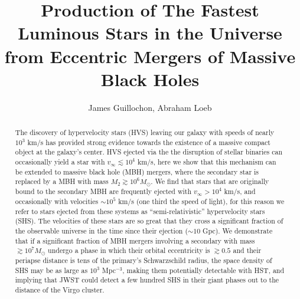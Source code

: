 \documentclass[a4paper,twocolumn]{emulateapj}
\begin{document}


\title{Production of The Fastest Luminous Stars in the Universe from Eccentric Mergers of Massive Black Holes}

\author{James Guillochon, Abraham Loeb}


\begin{abstract} 
The discovery of hypervelocity stars (HVS) leaving our galaxy with speeds of nearly $10^{3}$ km/s has provided strong evidence towards the existence of a massive compact object at the galaxy's center. HVS ejected via the the disruption of stellar binaries can occasionally yield a star with $v_{\infty} \lesssim 10^4$ km/s, here we show that this mechanism can be extended to massive black hole (MBH) mergers, where the secondary star is replaced by a MBH with mass $M_2 \gtrsim 10^6 M_{\odot}$. We find that stars that are originally bound to the secondary MBH are frequently ejected with $v_{\infty} > 10^4$ km/s, and occasionally with velocities $\sim 10^5$ km/s (one third the speed of light), for this reason we refer to stars ejected from these systems as ``semi-relativistic'' hypervelocity stars (SHS). The velocities of these stars are so great that they cross a significant fraction of the observable universe in the time since their ejection ($\sim 10$ Gpc). We demonstrate that if a significant fraction of MBH mergers involving a secondary with mass $\gtrsim 10^7 M_\odot$ undergo a phase in which their orbital eccentricity is $\gtrsim 0.5$ and their periapse distance is tens of the primary's Schwarzschild radius, the space density of SHS may be as large as $10^{3}$ Mpc$^{-3}$, making them potentially detectable with HST, and implying that JWST could detect a few hundred SHS in their giant phases out to the distance of the Virgo cluster.
\end{abstract}


\end{document}
